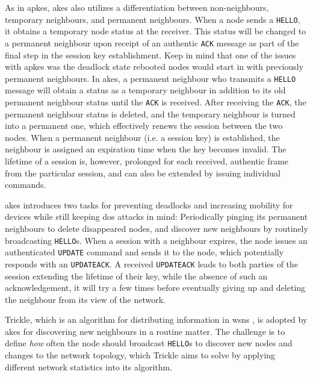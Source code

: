 As in \gls{apkes}, \gls{akes} also utilizes a differentiation between non-neighbours, temporary neighbours, and permanent neighbours. When a node sends a \texttt{HELLO}, it obtains a temporary node status at the receiver. This status will be changed to a permanent neighbour upon receipt of an authentic \texttt{ACK} message as part of the final step in the session key establishment. Keep in mind that one of the issues with \gls{apkes} was the deadlock state rebooted nodes would start in with previously permanent neighbours. In \gls{akes}, a permanent neighbour who transmits a \texttt{HELLO} message will obtain a status as a temporary neighbour in addition to its old permanent neighbour status until the \texttt{ACK} is received. After receiving the \texttt{ACK}, the permanent neighbour status is deleted, and the temporary neighbour is turned into a permanent one, which effectively renews the session between the two nodes. When a permanent neighbour (i.e. a session key) is established, the neighbour is assigned an expiration time when the key becomes invalid. The lifetime of a session is, however, prolonged for each received, authentic frame from the particular session, and can also be extended by issuing individual commands. 

\gls{akes} introduces two tasks for preventing deadlocks and increasing mobility for devices while still keeping \gls{dos} attacks in mind: Periodically pinging its permanent neighbours to delete disappeared nodes, and discover new neighbours by routinely broadcasting \texttt{HELLO}s. When a session with a neighbour expires, the node issues an authenticated \texttt{UPDATE} command and sends it to the node, which potentially responds with an \texttt{UPDATEACK}. A received \texttt{UPDATEACK} leads to both parties of the session extending the lifetime of their key, while the absence of such an acknowledgement, it will try a few times before eventually giving up and deleting the neighbour from its view of the network.

Trickle, which is an algorithm for distributing information in \gls{wsn}s \cite{levis2011trickle}, is adopted by \gls{akes} for discovering new neighbours in a routine matter. The challenge is to define \emph{how} often the node should broadcast \texttt{HELLO}s to discover new nodes and changes to the network topology, which Trickle aims to solve by applying different network statistics into its algorithm.


